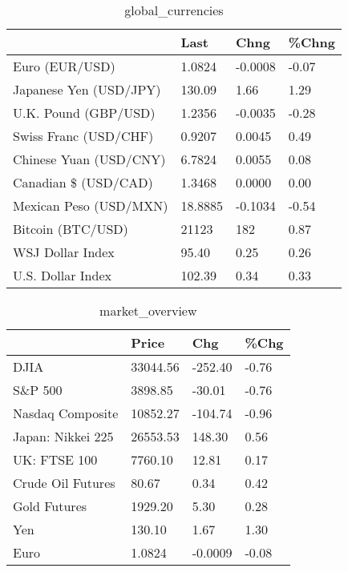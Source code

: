 \documentclass{article}%
\begin{document}
%


\begin{table}[htbp]%
\caption{global\_currencies}%
\centering%
\begin{adjustbox}{width=1\textwidth}%
\begin{tabular}{llll}
\toprule
                       &    Last &    Chng & \%Chng \\
\midrule
        Euro (EUR/USD) &  1.0824 & -0.0008 & -0.07 \\
Japanese Yen (USD/JPY) &  130.09 &    1.66 &  1.29 \\
  U.K. Pound (GBP/USD) &  1.2356 & -0.0035 & -0.28 \\
 Swiss Franc (USD/CHF) &  0.9207 &  0.0045 &  0.49 \\
Chinese Yuan (USD/CNY) &  6.7824 &  0.0055 &  0.08 \\
  Canadian \$ (USD/CAD) &  1.3468 &  0.0000 &  0.00 \\
Mexican Peso (USD/MXN) & 18.8885 & -0.1034 & -0.54 \\
     Bitcoin (BTC/USD) &   21123 &     182 &  0.87 \\
      WSJ Dollar Index &   95.40 &    0.25 &  0.26 \\
     U.S. Dollar Index &  102.39 &    0.34 &  0.33 \\
\bottomrule
\end{tabular}
%
\end{adjustbox}%
\end{table}

%


\begin{table}[htbp]%
\caption{market\_overview}%
\centering%
\begin{adjustbox}{width=1\textwidth}%
\begin{tabular}{llll}
\toprule
                  &    Price &     Chg &  \%Chg \\
\midrule
             DJIA & 33044.56 & -252.40 & -0.76 \\
          S\&P 500 &  3898.85 &  -30.01 & -0.76 \\
 Nasdaq Composite & 10852.27 & -104.74 & -0.96 \\
Japan: Nikkei 225 & 26553.53 &  148.30 &  0.56 \\
     UK: FTSE 100 &  7760.10 &   12.81 &  0.17 \\
Crude Oil Futures &    80.67 &    0.34 &  0.42 \\
     Gold Futures &  1929.20 &    5.30 &  0.28 \\
              Yen &   130.10 &    1.67 &  1.30 \\
             Euro &   1.0824 & -0.0009 & -0.08 \\
\bottomrule
\end{tabular}
%
\end{adjustbox}%
\end{table}

%
\end{document}

